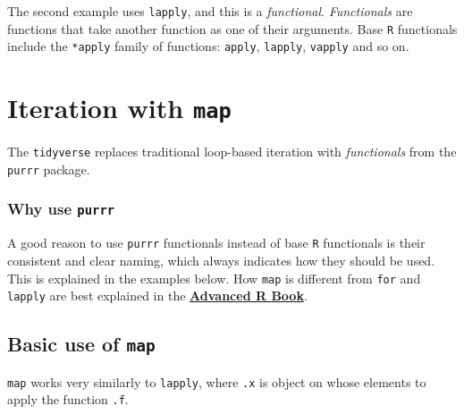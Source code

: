 \documentclass[]{book}
\newenvironment{Shaded}{}{}
\newcommand{\CommentTok}[1]{\textcolor[rgb]{0.38,0.63,0.69}{\textit{#1}}}
\newcommand{\DataTypeTok}[1]{\textcolor[rgb]{0.56,0.13,0.00}{#1}}
\newcommand{\KeywordTok}[1]{\textcolor[rgb]{0.00,0.44,0.13}{\textbf{#1}}}
\newcommand{\NormalTok}[1]{#1}
\newcommand{\OperatorTok}[1]{\textcolor[rgb]{0.40,0.40,0.40}{#1}}
\newcommand{\StringTok}[1]{\textcolor[rgb]{0.25,0.44,0.63}{#1}}
\begin{document}
The second example uses \texttt{lapply}, and this is a \emph{functional}. \emph{Functionals} are functions that take another function as one of their arguments. Base \texttt{R} functionals include the \texttt{*apply} family of functions: \texttt{apply}, \texttt{lapply}, \texttt{vapply} and so on.

\hypertarget{iteration-with-map}{%
\section{\texorpdfstring{Iteration with \texttt{map}}{Iteration with map}}\label{iteration-with-map}}

The \texttt{tidyverse} replaces traditional loop-based iteration with \emph{functionals} from the \texttt{purrr} package.

\hypertarget{why-use-purrr}{%
\subsubsection*{\texorpdfstring{Why use \texttt{purrr}}{Why use purrr}}\label{why-use-purrr}}

A good reason to use \texttt{purrr} functionals instead of base \texttt{R} functionals is their consistent and clear naming, which always indicates how they should be used. This is explained in the examples below. How \texttt{map} is different from \texttt{for} and \texttt{lapply} are best explained in the \textbf{\href{https://adv-r.hadley.nz/functionals.html}{Advanced R Book}}.

\hypertarget{basic-use-of-map}{%
\subsection{\texorpdfstring{Basic use of \texttt{map}}{Basic use of map}}\label{basic-use-of-map}}

\texttt{map} works very similarly to \texttt{lapply}, where \texttt{.x} is object on whose elements to apply the function \texttt{.f}.

\begin{Shaded}
\end{Shaded}
\end{document}
